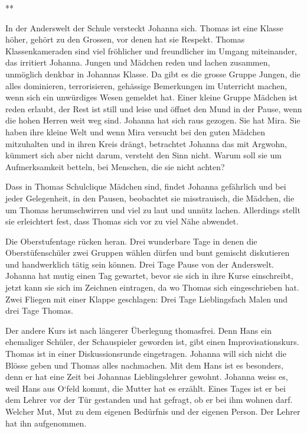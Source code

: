\documentclass[10pt,titlepage,a5paper]{book}
\newcommand{\sterne}{\par{\centering ***\par}}
\begin{document}
\sterne

In der Anderswelt der Schule versteckt Johanna sich. Thomas ist eine Klasse höher, gehört zu den Grossen, vor denen hat sie Respekt. Thomas Klassenkameraden sind viel fröhlicher und freundlicher im Umgang miteinander, das irritiert Johanna. Jungen und Mädchen reden und lachen zusammen, unmöglich denkbar in Johannas Klasse. Da gibt es die grosse Gruppe Jungen, die alles dominieren, terrorisieren, gehässige Bemerkungen im Unterricht machen, wenn sich ein unwürdiges Wesen gemeldet hat. Einer kleine Gruppe Mädchen ist reden erlaubt, der Rest ist still und leise und öffnet den Mund in der Pause, wenn die hohen Herren weit weg sind. Johanna hat sich raus gezogen. Sie hat Mira. Sie haben ihre kleine Welt und wenn Mira versucht bei den guten Mädchen mitzuhalten und in ihren Kreis drängt, betrachtet Johanna das mit Argwohn, kümmert sich aber nicht darum, versteht den Sinn nicht. Warum soll sie um Aufmerksamkeit betteln, bei Menschen, die sie nicht achten?

 Dass in Thomas Schulclique Mädchen sind, findet Johanna gefährlich und bei jeder Gelegenheit, in den Pausen, beobachtet sie misstrauisch, die Mädchen, die um Thomas herumschwirren und viel zu laut und unnütz lachen. Allerdings stellt sie erleichtert fest, dass Thomas sich vor zu viel Nähe abwendet. 
 
Die Oberstufentage rücken heran. Drei wunderbare Tage in denen die Oberstüfenschüler zwei Gruppen wählen dürfen und bunt gemischt diskutieren und handwerklich tätig sein können. Drei Tage Pause von der Anderswelt. Johanna hat mutig einen Tag gewartet, bevor sie sich in ihre Kurse einschreibt, jetzt kann sie sich im Zeichnen eintragen, da wo Thomas sich eingeschrieben hat. Zwei Fliegen mit einer Klappe geschlagen: Drei Tage Lieblingsfach Malen und drei Tage Thomas.

Der andere Kurs ist nach längerer Überlegung thomasfrei. Denn Hans ein ehemaliger Schüler, der Schauspieler geworden ist, gibt einen Improvisationskurs. Thomas ist in einer Diskussionsrunde eingetragen. Johanna will sich nicht die Blösse geben und Thomas alles nachmachen. 
Mit dem Hans ist es besonders, denn er hat eine Zeit bei Johannas Lieblingslehrer gewohnt. Johanna weiss es, weil Hans aus O`feld kommt, die Mutter hat es erzählt. Eines Tages ist er bei dem Lehrer vor der Tür gestanden und hat gefragt, ob er bei ihm wohnen darf. Welcher Mut, Mut zu dem eigenen Bedürfnis und der eigenen Person. Der Lehrer hat ihn aufgenommen. 
\end{document}

